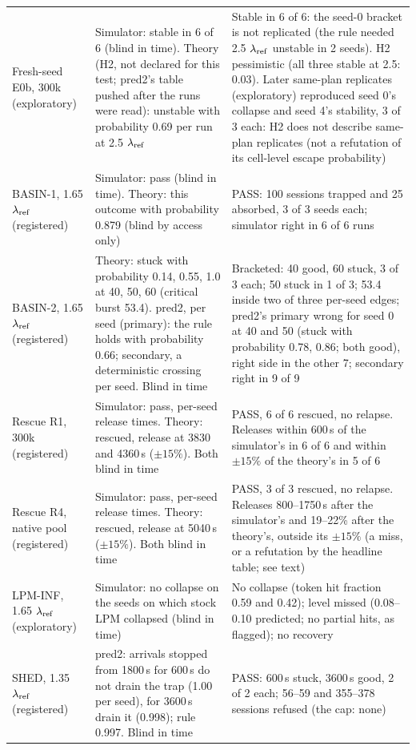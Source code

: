\begin{table}[!tp]
\begin{tabular}{@{}>{\raggedright\arraybackslash}p{3.0cm} >{\raggedright\arraybackslash}p{7.4cm} >{\raggedright\arraybackslash}p{6.5cm}@{}}
\addlinespace[0.3pt]
Fresh-seed E0b, 300k (exploratory) & Simulator: stable in 6 of 6 (blind in time). Theory (H2, not declared for this test; pred2's table pushed after the runs were read): unstable with probability 0.69 per run at 2.5 $\lambda_{\mathrm{ref}}$ & Stable in 6 of 6: the seed-0 bracket is not replicated (the rule needed 2.5 $\lambda_{\mathrm{ref}}$ unstable in 2 seeds). H2 pessimistic (all three stable at 2.5: 0.03). Later same-plan replicates (exploratory) reproduced seed 0's collapse and seed 4's stability, 3 of 3 each: H2 does not describe same-plan replicates (not a refutation of its cell-level escape probability)\\
\addlinespace[0.3pt]
BASIN-1, 1.65 $\lambda_{\mathrm{ref}}$ (registered) & Simulator: pass (blind in time). Theory: this outcome with probability 0.879 (blind by access only) & PASS: 100 sessions trapped and 25 absorbed, 3 of 3 seeds each; simulator right in 6 of 6 runs\\
\addlinespace[0.3pt]
BASIN-2, 1.65 $\lambda_{\mathrm{ref}}$ (registered) & Theory: stuck with probability 0.14, 0.55, 1.0 at 40, 50, 60 (critical burst 53.4). pred2, per seed (primary): the rule holds with probability 0.66; secondary, a deterministic crossing per seed. Blind in time & Bracketed: 40 good, 60 stuck, 3 of 3 each; 50 stuck in 1 of 3; 53.4 inside two of three per-seed edges; pred2's primary wrong for seed 0 at 40 and 50 (stuck with probability 0.78, 0.86; both good), right side in the other 7; secondary right in 9 of 9\\
\addlinespace[0.3pt]
Rescue R1, 300k (registered) & Simulator: pass, per-seed release times. Theory: rescued, release at 3830 and 4360\,s ($\pm15\%$). Both blind in time & PASS, 6 of 6 rescued, no relapse. Releases within 600\,s of the simulator's in 6 of 6 and within $\pm15\%$ of the theory's in 5 of 6\\
\addlinespace[0.3pt]
Rescue R4, native pool (registered) & Simulator: pass, per-seed release times. Theory: rescued, release at 5040\,s ($\pm15\%$). Both blind in time & PASS, 3 of 3 rescued, no relapse. Releases 800--1750\,s after the simulator's and 19--22\% after the theory's, outside its $\pm15\%$ (a miss, or a refutation by the headline table; see text)\\
\addlinespace[0.3pt]
LPM-INF, 1.65 $\lambda_{\mathrm{ref}}$ (exploratory) & Simulator: no collapse on the seeds on which stock LPM collapsed (blind in time) & No collapse (token hit fraction 0.59 and 0.42); level missed (0.08--0.10 predicted; no partial hits, as flagged); no recovery\\
\addlinespace[0.3pt]
SHED, 1.35 $\lambda_{\mathrm{ref}}$ (registered) & pred2: arrivals stopped from 1800\,s for 600\,s do not drain the trap (1.00 per seed), for 3600\,s drain it (0.998); rule 0.997. Blind in time & PASS: 600\,s stuck, 3600\,s good, 2 of 2 each; 56--59 and 355--378 sessions refused (the cap: none)\\

\end{tabular}
\end{table}
